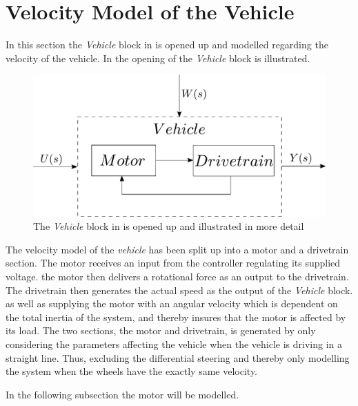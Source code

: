 \section{Velocity Model of the Vehicle}
In this section the \textit{Vehicle} block in   is opened up and modelled regarding the velocity of the vehicle. In  the opening of the \textit{Vehicle} block is illustrated.

\begin{figure}[H]
	\centering
	\includegraphics[scale=0.6]{figures/plantopen.pdf}
	\caption{The \textit{Vehicle} block in   is opened up and illustrated in more detail}
	\label{fig:Velocitymodelplantopen}
\end{figure}

The velocity model of the \textit{vehicle} has been split up into a motor and a drivetrain section. The motor receives an input from the controller regulating its supplied voltage. the motor then delivers a rotational force as an output to the drivetrain. The drivetrain then generates the actual speed as the output of the \textit{Vehicle} block. as well as supplying the motor with an angular velocity which is dependent on the total inertia of the system, and thereby insures that the motor is affected by its load. The two sections, the motor and drivetrain, is generated by only considering the parameters affecting the vehicle when the vehicle is driving in a straight line. Thus, excluding the differential steering and thereby only modelling the system when the wheels have the exactly same velocity.

In the following subsection the motor will be modelled.